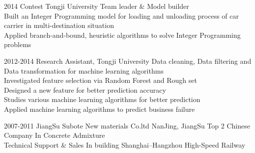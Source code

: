 \documentclass[]{friggeri-cv} %
\begin{document}
\begin{entrylist}
\entry
{2014}
{Contest }
{Tongji University}
{Team leader \& Model builder \\
Built an Integer Programming model for loading and unloading process of car carrier in multi-destination situation\\
Applied branch-and-bound, heuristic algorithms to solve Integer Programming problems
}

\entry
{2012-2014}
{Research Assistant, }
{Tongji University}
{Data cleaning, Data filtering and Data transformation for machine learning algorithms\\
 Investigated feature selection via Random Forest and Rough set\\
 Designed a new feature for better prediction accuracy\\
 Studies various machine learning algorithms for better prediction\\
 Applied machine learning algorithms to predict business failure
}



\entry
{2007-2011}
{JiangSu Subote New materials Co.ltd}
{NanJing, JiangSu}
{Top 2 Chinese Company In Concrete Admixture\\
Technical Support \& Sales In building Shanghai–Hangzhou High-Speed Railway}




\end{entrylist}
\end{document}
